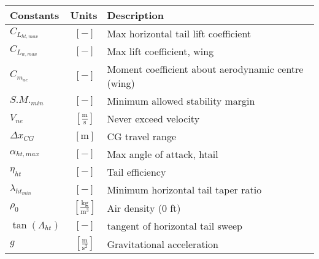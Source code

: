 % 

{\footnotesize
\begin{supertabular}{lcl}
\toprule
Constants & Units & Description \\ \midrule
$C_{L_{ht,max}}$ & $~[-]$ & Max horizontal tail lift coefficient \\
$C_{L_{w,max}}$ & $~[-]$ & Max lift coefficient, wing \\
$C_{m_{ac}}$ & $~[-]$ & Moment coefficient about aerodynamic centre (wing) \\
$S.M._{min}$ & $~[-]$ & Minimum allowed stability margin\\
$V_{ne}$ & $~\mathrm{[\tfrac{m}{s}]}$ & Never exceed velocity \\
$\Delta x_{CG}$ & $~\mathrm{[m]}$ & CG travel range\\
$\alpha_{ht,max}$ & $~[-]$ & Max angle of attack, htail \\
$\eta_{ht}$ & $~[-]$ & Tail efficiency \\
$\lambda_{ht_{min}} $ & $~[-]$ & Minimum horizontal tail taper ratio \\
$\rho_0$ & $~\mathrm{[\tfrac{kg}{m^{3}}]}$ & Air density (0 ft) \\
$\tan(\Lambda_{ht})$ & $~[-]$ & tangent of horizontal tail sweep \\
$g$ & $~\mathrm{[\tfrac{m}{s^{2}}]}$ & Gravitational acceleration \\
\bottomrule
\end{supertabular}}

% 
